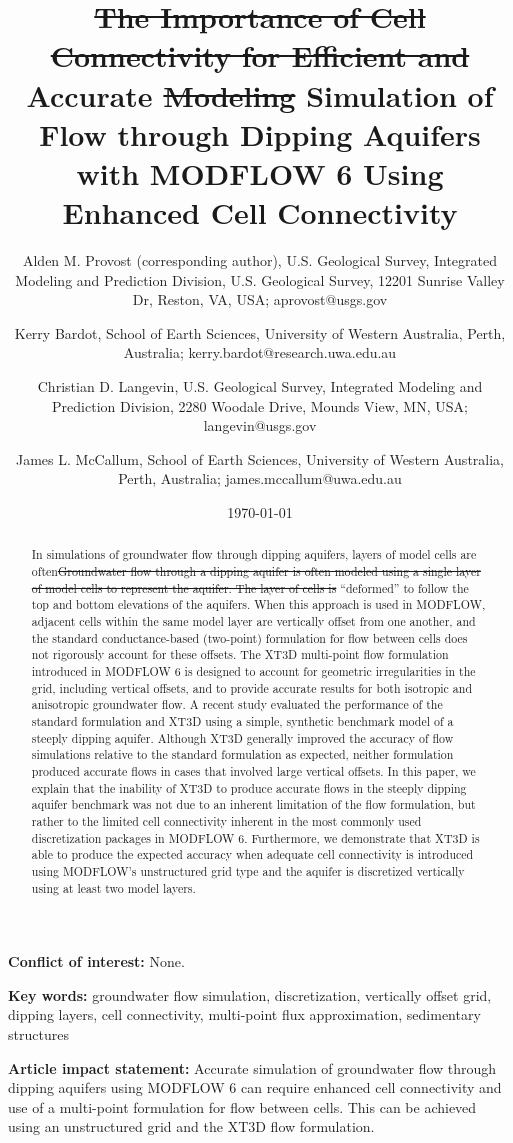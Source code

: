 \documentclass{article}
\title{{\color{red} \sout{The Importance of Cell Connectivity for Efficient and }}Accurate {\color{red} \sout{Modeling} Simulation} of Flow through Dipping Aquifers with MODFLOW 6 {\color{red} Using Enhanced Cell Connectivity}}
\author{
	Alden M. Provost {\color{red} (corresponding author)}, U.S. Geological Survey, Integrated Modeling and Prediction Division, U.S. Geological Survey, 12201 Sunrise Valley Dr, Reston, VA, USA{\color{red}; aprovost@usgs.gov} \\
	\and 
	Kerry Bardot, School of Earth Sciences, University of Western Australia, Perth, Australia{\color{red}; kerry.bardot@research.uwa.edu.au} \\
	\and 
	Christian D. Langevin, U.S. Geological Survey, Integrated Modeling and Prediction Division, 2280 Woodale Drive, Mounds View, MN, USA{\color{red}; langevin@usgs.gov} \\
	\and 
	James L. McCallum, School of Earth Sciences, University of Western Australia, Perth, Australia{\color{red}; james.mccallum@uwa.edu.au} \\
	}
\date{\today}
\begin{document}

{\let\newpage\relax\maketitle}

\textbf{Conflict of interest:} None.

\textbf{Key words:} groundwater flow simulation, discretization, vertically offset grid, dipping layers, cell connectivity, multi-point flux approximation, sedimentary structures

\textbf{Article impact statement:} Accurate simulation of groundwater flow through dipping aquifers using MODFLOW 6 can require enhanced cell connectivity and use of a multi-point formulation for flow between cells. This can be achieved using an unstructured grid and the XT3D flow formulation.

\begin{abstract}

{\color{red} In simulations of groundwater flow through dipping aquifers, layers of model cells are often\sout{Groundwater flow through a dipping aquifer is often modeled using a single layer of model cells to represent the aquifer. The layer of cells is }}``deformed'' to follow the top and bottom elevations of the aquifer{\color{red}s}. When this approach is used in MODFLOW, adjacent cells within the {\color{red} same} model layer are vertically offset from one another, and the standard conductance-based (two-point) formulation for flow between cells does not rigorously account for these offsets. The XT3D multi-point flow formulation introduced in MODFLOW 6 is designed to account for geometric irregularities in the grid, including vertical offsets, and to provide accurate results for both isotropic and anisotropic groundwater flow.  A recent study evaluated the performance of the standard formulation and XT3D using a simple, synthetic benchmark model of a steeply dipping aquifer. Although XT3D generally improved the accuracy of flow simulations relative to the standard formulation as expected, neither formulation produced accurate flows in cases that involved large vertical offsets. In this paper, we explain that the inability of XT3D to produce accurate flows in the steeply dipping aquifer benchmark was not due to an inherent limitation of the flow formulation, but {\color{red} rather} to the limited cell connectivity inherent in the most commonly used discretization packages in MODFLOW 6. Furthermore, we demonstrate that XT3D is able to produce the expected accuracy when adequate cell connectivity is introduced using MODFLOW's unstructured grid type and the aquifer is discretized vertically using at least two model layers.

\end{abstract}
\end{document}
